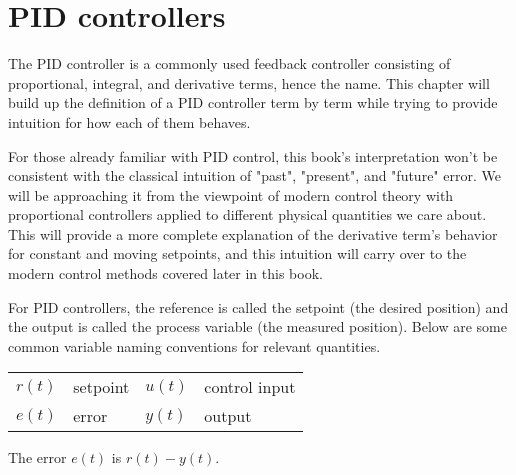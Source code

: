 
\chapter{PID controllers}

The PID controller is a commonly used feedback controller consisting of
proportional, integral, and derivative terms, hence the name. This chapter will
build up the definition of a PID controller term by term while trying to provide
intuition for how each of them behaves.

For those already familiar with PID control, this book's interpretation won't be
consistent with the classical intuition of "past", "present", and "future"
error. We will be approaching it from the viewpoint of modern control theory
with proportional controllers applied to different physical quantities we care
about. This will provide a more complete explanation of the derivative term's
behavior for constant and moving \glspl{setpoint}, and this intuition will carry
over to the modern control methods covered later in this book.

For PID controllers, the \gls{reference} is called the \gls{setpoint} (the
desired position) and the \gls{output} is called the \gls{process variable} (the
measured position). Below are some common variable naming conventions for
relevant quantities.

\begin{figurekey}
  \begin{tabular}{llll}
    $r(t)$ & \gls{setpoint} & $u(t)$ & \gls{control input} \\
    $e(t)$ & \gls{error} & $y(t)$ & \gls{output}
  \end{tabular}
\end{figurekey}

The \gls{error} $e(t)$ is $r(t) - y(t)$.

\renewcommand*{\chapterpath}{\partpath/pid-controllers}








